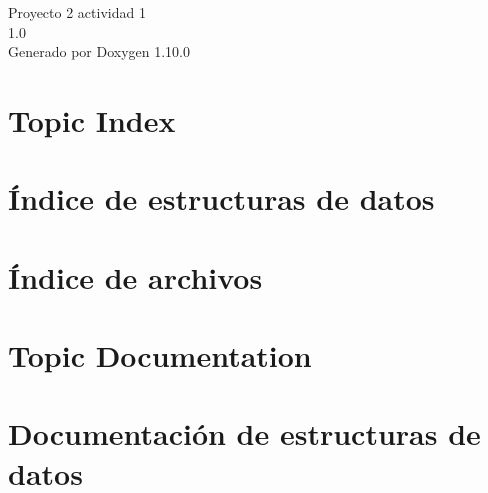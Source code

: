 \documentclass[twoside]{book}
\newcommand{\+}{\discretionary{\mbox{\scriptsize$\hookleftarrow$}}{}{}}
\newcommand{\clearemptydoublepage}{%
    \newpage{\pagestyle{empty}\cleardoublepage}%
  }
\begin{document}
  \raggedbottom
    \hypersetup{pageanchor=false,
                bookmarksnumbered=true,
                pdfencoding=unicode
               }
  \begin{titlepage}
  \vspace*{7cm}
  \begin{center}%
  {\Large Proyecto 2 actividad 1}\\
  [1ex]\large 1.\+0 \\
  \vspace*{1cm}
  {\large Generado por Doxygen 1.10.0}\\
  \end{center}
  \end{titlepage}
  \clearemptydoublepage
  \tableofcontents
  \clearemptydoublepage
  \hypersetup{pageanchor=true}


\chapter{Topic Index}

\chapter{Índice de estructuras de datos}

\chapter{Índice de archivos}

\chapter{Topic Documentation}

\chapter{Documentación de estructuras de datos}









\end{document}
